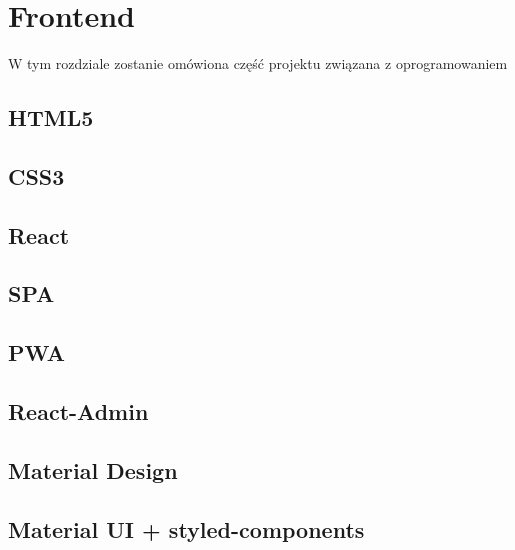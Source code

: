 \chapter{Frontend}
\label{ch:funplenop}
W tym rozdziale zostanie omówiona część projektu związana z oprogramowaniem

\section{HTML5}
\section{CSS3}
\section{React}
\section*{SPA}
\section*{PWA}
\section{React-Admin}
\section{Material Design}
\section{Material UI + styled-components}